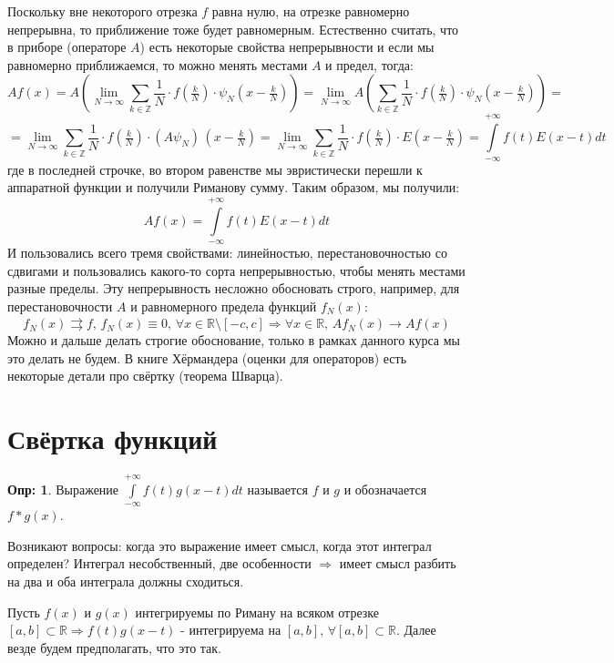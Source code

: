 \documentclass[12pt]{article}
\newcommand{\MR}{\mathbb{R}}
\newcommand{\MZ}{\mathbb{Z}}
\theoremstyle{definition}
\newtheorem{defn}{Опр:}
\newcommand{\ddsum}[2]{\displaystyle\sum\limits_{#1}^{#2}}
\newcommand{\ddint}[2]{\displaystyle\int\limits_{#1}^{#2}}
\newcommand{\uconv}[1]{\overset{#1}{\rightrightarrows}}
\begin{document}
Поскольку вне некоторого отрезка $f$ равна нулю, на отрезке равномерно непрерывна, то приближение тоже будет равномерным. Естественно считать, что в приборе (операторе $A$) есть некоторые свойства непрерывности и если мы равномерно приближаемся, то можно менять местами $A$ и предел, тогда:
$$
	Af(x) = A\left(\lim\limits_{N\to \infty}\ddsum{k \in \MZ}{}\dfrac{1}{N}{\cdot}f\left(\tfrac{k}{N}\right){\cdot}\psi_N\left(x - \tfrac{k}{N}\right) \right) = \lim\limits_{N \to \infty}A\left(\ddsum{k \in \MZ}{}\dfrac{1}{N}{\cdot}f\left(\tfrac{k}{N}\right){\cdot}\psi_N\left(x - \tfrac{k}{N}\right)\right) = 
$$
$$
	= \lim\limits_{N \to \infty}\ddsum{k \in \MZ}{}\dfrac{1}{N}{\cdot}f\left(\tfrac{k}{N}\right){\cdot}(A\psi_N)\, \left(x -\tfrac{k}{N}\right) = \lim\limits_{N \to \infty}\ddsum{k \in \MZ}{}\dfrac{1}{N}{\cdot}f\left(\tfrac{k}{N}\right){\cdot}E\left(x -\tfrac{k}{N}\right) = \ddint{-\infty}{+\infty}f(t)E(x - t)dt
$$
где в последней строчке, во втором равенстве мы эвристически перешли к аппаратной функции и получили Риманову сумму. Таким образом, мы получили:
$$
	Af(x) = \ddint{-\infty}{+\infty}f(t)E(x - t)dt
$$
И пользовались всего тремя свойствами: линейностью, перестановочностью со сдвигами и пользовались какого-то сорта непрерывностью, чтобы менять местами разные пределы. Эту непрерывность несложно обосновать строго, например, для перестановочности $A$ и равномерного предела функций $f_N(x)$:
$$
	f_N(x) \uconv{} f, \, f_N(x) \equiv 0, \, \forall x \in \MR \setminus [-c,c] \Rightarrow \forall x \in \MR, \, Af_N(x) \to Af(x)
$$  
Можно и дальше делать строгие обоснование, только в рамках данного курса мы это делать не будем. В книге Хёрмандера (оценки для операторов) есть некоторые детали про свёртку (теорема Шварца).

\newpage
\section*{Свёртка функций}
\begin{defn}
	Выражение $\ddint{-\infty}{+\infty}f(t)g(x - t)dt$ называется  $f$ и $g$ и обозначается $f*g(x)$.
\end{defn}
Возникают вопросы: когда это выражение имеет смысл, когда этот интеграл определен? Интеграл несобственный, две особенности $\Rightarrow$ имеет смысл разбить на два и оба интеграла должны сходиться.

Пусть $f(x)$ и $g(x)$ интегрируемы по Риману на всяком отрезке $[a,b] \subset \MR \Rightarrow f(t)g(x-t)$ - интегрируема на $[a,b], \, \forall [a,b]\subset \MR$.
Далее везде будем предполагать, что это так.
 
\end{document}
